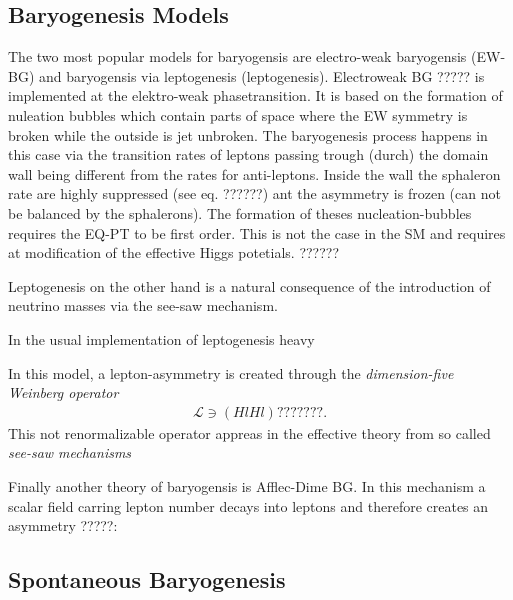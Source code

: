 \documentclass[13pt,a4paper,twoside,titlepage]{article}
\begin{document}
\subsection{Baryogenesis Models}
The two most popular models for baryogensis are electro-weak baryogensis (EW-BG) and baryogensis via leptogenesis (leptogenesis).
Electroweak BG ????? is implemented at the elektro-weak phasetransition. It is based on the formation of nuleation bubbles which contain parts of space where the EW symmetry is broken while the outside is jet unbroken. The baryogenesis process happens in this case via the transition rates of leptons passing trough (durch) the domain wall being different from the rates for anti-leptons. Inside the wall the sphaleron rate are highly suppressed (see eq. ??????) ant the asymmetry is frozen (can not be balanced by the sphalerons).
The formation of theses nucleation-bubbles requires the EQ-PT to be first order. This is not the case in the SM and requires at modification of the effective Higgs potetials. ??????

\noindent
Leptogenesis on the other hand is a natural consequence of the introduction of neutrino masses via the see-saw mechanism.

In the usual implementation of leptogenesis heavy


In this model, a lepton-asymmetry is created through the \emph{dimension-five Weinberg operator}
\begin{align}
    \mathcal{L} \ni (H l H l) ???????.
\end{align}
This not renormalizable operator appreas in the effective theory from so called \emph{see-saw mechanisms}


Finally another theory of baryogensis is Afflec-Dime BG. In this mechanism a scalar field carring lepton number decays into leptons and therefore creates an asymmetry ?????:

\subsection{Spontaneous Baryogenesis}
\label{sec:spontaneour_bayrogenesis}
\end{document}
